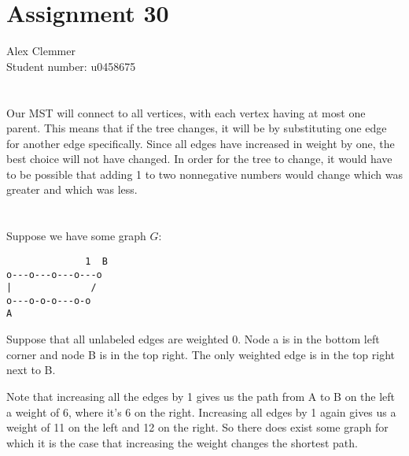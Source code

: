 \documentclass[a4paper]{article}
\begin{document}
\section*{Assignment 30}
Alex Clemmer\\
Student number: u0458675

\section{}

Our MST will connect to all vertices, with each vertex having at most one parent. This means that if the tree changes, it will be by substituting one edge for another edge specifically. Since all edges have increased in weight by one, the best choice will not have changed. In order for the tree to change, it would have to be possible that adding 1 to two nonnegative numbers would change which was greater and which was less.

\section{}

Suppose we have some graph $G$:

\begin{verbatim}
              1  B
o---o---o---o---o
|              /
o---o-o-o---o-o
A
\end{verbatim}

Suppose that all unlabeled edges are weighted 0. Node a is in the bottom left corner and node B is in the top right. The only weighted edge is in the top right next to B.

Note that increasing all the edges by 1 gives us the path from A to B on the left a weight of 6, where it's 6 on the right. Increasing all edges by 1 again gives us a weight of 11 on the left and 12 on the right. So there does exist some graph for which it is the case that increasing the weight changes the shortest path.
\end{document}
